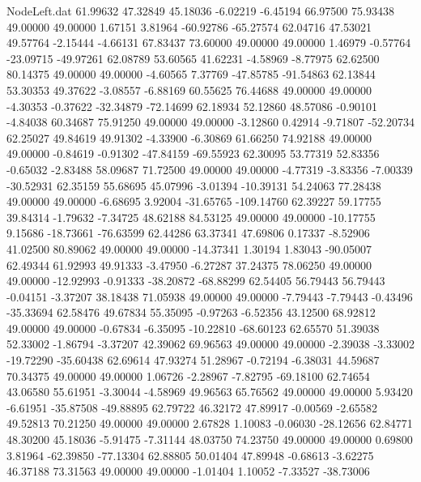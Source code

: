 \begin{filecontents}{NodeLeft.dat}
  61.99632   47.32849   45.18036    -6.02219   -6.45194   66.97500   75.93438   49.00000   49.00000    1.67151    3.81964  -60.92786  -65.27574
  62.04716   47.53021   49.57764    -2.15444   -4.66131   67.83437   73.60000   49.00000   49.00000    1.46979   -0.57764  -23.09715  -49.97261
  62.08789   53.60565   41.62231    -4.58969   -8.77975   62.62500   80.14375   49.00000   49.00000   -4.60565    7.37769  -47.85785  -91.54863
  62.13844   53.30353   49.37622    -3.08557   -6.88169   60.55625   76.44688   49.00000   49.00000   -4.30353   -0.37622  -32.34879  -72.14699
  62.18934   52.12860   48.57086    -0.90101   -4.84038   60.34687   75.91250   49.00000   49.00000   -3.12860    0.42914   -9.71807  -52.20734
  62.25027   49.84619   49.91302    -4.33900   -6.30869   61.66250   74.92188   49.00000   49.00000   -0.84619   -0.91302  -47.84159  -69.55923
  62.30095   53.77319   52.83356    -0.65032   -2.83488   58.09687   71.72500   49.00000   49.00000   -4.77319   -3.83356   -7.00339  -30.52931
  62.35159   55.68695   45.07996    -3.01394  -10.39131   54.24063   77.28438   49.00000   49.00000   -6.68695    3.92004  -31.65765 -109.14760
  62.39227   59.17755   39.84314    -1.79632   -7.34725   48.62188   84.53125   49.00000   49.00000  -10.17755    9.15686  -18.73661  -76.63599
  62.44286   63.37341   47.69806     0.17337   -8.52906   41.02500   80.89062   49.00000   49.00000  -14.37341    1.30194    1.83043  -90.05007
  62.49344   61.92993   49.91333    -3.47950   -6.27287   37.24375   78.06250   49.00000   49.00000  -12.92993   -0.91333  -38.20872  -68.88299
  62.54405   56.79443   56.79443    -0.04151   -3.37207   38.18438   71.05938   49.00000   49.00000   -7.79443   -7.79443   -0.43496  -35.33694
  62.58476   49.67834   55.35095    -0.97263   -6.52356   43.12500   68.92812   49.00000   49.00000   -0.67834   -6.35095  -10.22810  -68.60123
  62.65570   51.39038   52.33002    -1.86794   -3.37207   42.39062   69.96563   49.00000   49.00000   -2.39038   -3.33002  -19.72290  -35.60438
  62.69614   47.93274   51.28967    -0.72194   -6.38031   44.59687   70.34375   49.00000   49.00000    1.06726   -2.28967   -7.82795  -69.18100
  62.74654   43.06580   55.61951    -3.30044   -4.58969   49.96563   65.76562   49.00000   49.00000    5.93420   -6.61951  -35.87508  -49.88895
  62.79722   46.32172   47.89917    -0.00569   -2.65582   49.52813   70.21250   49.00000   49.00000    2.67828    1.10083   -0.06030  -28.12656
  62.84771   48.30200   45.18036    -5.91475   -7.31144   48.03750   74.23750   49.00000   49.00000    0.69800    3.81964  -62.39850  -77.13304
  62.88805   50.01404   47.89948    -0.68613   -3.62275   46.37188   73.31563   49.00000   49.00000   -1.01404    1.10052   -7.33527  -38.73006

\end{filecontents}
